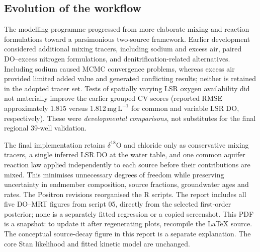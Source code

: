 \documentclass[11pt,a4paper]{article}
\newcommand{\mgL}{\mathrm{mg\,L^{-1}}}
\begin{document}
\subsection{Evolution of the workflow}
The modelling programme progressed from more elaborate mixing and reaction formulations toward a parsimonious two-source framework. Earlier development considered additional mixing tracers, including sodium and excess air, paired DO--excess nitrogen formulations, and denitrification-related alternatives. Including sodium caused MCMC convergence problems, whereas excess air provided limited added value and generated conflicting results; neither is retained in the adopted tracer set. Tests of spatially varying LSR oxygen availability did not materially improve the earlier grouped CV scores (reported RMSE approximately 1.815 versus 1.812\,\(\mgL\) for common and variable LSR DO, respectively). These were \emph{developmental comparisons}, not substitutes for the final regional 39-well validation.

The final implementation retains \(\delta^{18}\mathrm{O}\) and chloride only as conservative mixing tracers, a single inferred LSR DO at the water table, and one common aquifer reaction law applied independently to each source before their contributions are mixed. This minimises unnecessary degrees of freedom while preserving uncertainty in endmember composition, source fractions, groundwater ages and rates. The Positron revisions reorganised the R scripts. The report includes all five DO--MRT figures from script 05, directly from the selected first-order posterior; none is a separately fitted regression or a copied screenshot. This PDF is a snapshot: to update it after regenerating plots, recompile the \LaTeX{} source. The conceptual source-decay figure in this report is a separate explanation. The core Stan likelihood and fitted kinetic model are unchanged.
\end{document}
